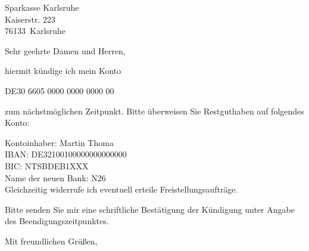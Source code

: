 \documentclass[a4paper, 12pt, KOMAold]{scrlttr2}
\newcommand{\Kundennr}{DE30 6605 0000 0000 0000 00}    %
\newcommand{\Empfaenger}{Sparkasse Karlsruhe} %
\newcommand{\EStrasse}{Kaiserstr. 223}    %
\newcommand{\EPLZ}{76133}                   %
\newcommand{\EOrt}{Karlsruhe}       %
\begin{document}
    \begin{letter}{\Empfaenger \\ \EStrasse \\ \EPLZ~\EOrt}
    \date{\today}%
    \subject{Kündigung}
    \opening{Sehr geehrte Damen und Herren,}
    hiermit kündige ich mein Konto

    {}\Kundennr{}

    zum nächstmöglichen Zeitpunkt.
    Bitte überweisen Sie Restguthaben auf folgendes Konto:

Kontoinhaber: Martin Thoma\\
IBAN: DE32100100000000000000\\
BIC: NTSBDEB1XXX\\
Name der neuen Bank: N26\\

Gleichzeitig widerrufe ich eventuell erteile Freistellungsaufträge.

Bitte senden Sie mir eine schriftliche Bestätigung der Kündigung unter Angabe
des Beendigungszeitpunktes.

    \closing{Mit freundlichen Grüßen,}
    \end{letter}
\end{document}
